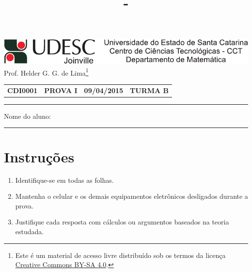 \documentclass[12pt,a4paper]{article}
\author{\eu}
\title{\tipo - \disciplina}
\date{\data}
\newcommand*\tipo{PROVA I}
\newcommand*\turma{TURMA B}
\newcommand*\disciplina{CDI0001}
\newcommand*\eu{Helder G. G. de Lima}
\newcommand*\data{09/04/2015}
\begin{document}
\thispagestyle{empty}
\begin{center}
\includegraphics{udesc_joinville_cabecalho.pdf}
\\ Prof. \eu\footnote{
Este é um material de acesso livre distribuído sob os termos da licença \href{https://creativecommons.org/licenses/by-sa/4.0/deed.pt_BR}{Creative Commons BY-SA 4.0}.}

\noindent\begin{tabular}{l c c r}
  \textbf{\disciplina}
& \textbf{\tipo}
& \textbf{\data}
& \textbf{\turma}
\end{tabular}\vspace{-0.3cm}
\noindent\rule{17cm}{0.01cm}
\end{center}

\noindent Nome do aluno: \rule{14cm}{0.01cm}

\section*{Instruções}

\begin{enumerate}
\renewcommand{\theenumi}{\Roman{enumi}}
\item Identifique-se em todas as folhas.
\item Mantenha o celular e os demais equipamentos eletrônicos desligados durante a prova.
\item Justifique cada resposta com cálculos ou argumentos baseados na teoria estudada.
\end{enumerate}
\end{document}
